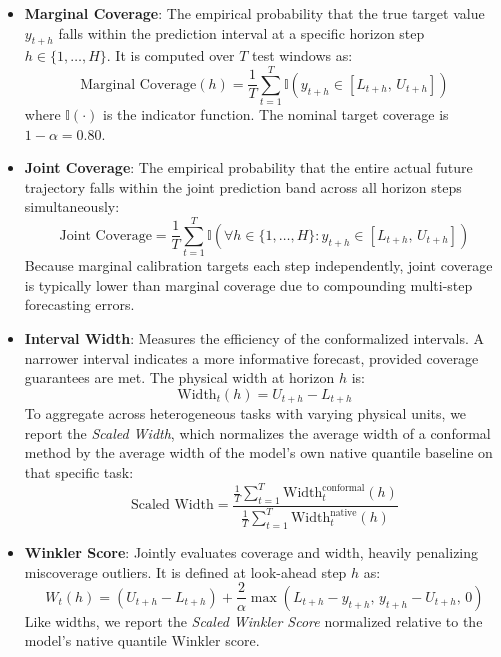 \documentclass[12pt, a4paper]{article}
\begin{document}
\begin{itemize}
	\item \textbf{Marginal Coverage}: The empirical probability that the true target value \(y_{t+h}\) falls within the prediction interval at a specific horizon step \(h \in \{1, \dots, H\}\). It is computed over \(T\) test windows as:
		\begin{equation}
			\text{Marginal Coverage}(h) = \frac{1}{T} \sum_{t=1}^T \mathbb{I}\left( y_{t+h} \in [L_{t+h}, \, U_{t+h}] \right)
		\end{equation}
		where \(\mathbb{I}(\cdot)\) is the indicator function. The nominal target coverage is \(1-\alpha = 0.80\).

	\item \textbf{Joint Coverage}: The empirical probability that the entire actual future trajectory falls within the joint prediction band across all horizon steps simultaneously:
		\begin{equation}
			\text{Joint Coverage} = \frac{1}{T} \sum_{t=1}^T \mathbb{I}\left( \forall h \in \{1, \dots, H\}: y_{t+h} \in [L_{t+h}, \, U_{t+h}] \right)
		\end{equation}
		Because marginal calibration targets each step independently, joint coverage is typically lower than marginal coverage due to compounding multi-step forecasting errors.

	\item \textbf{Interval Width}: Measures the efficiency of the conformalized intervals. A narrower interval indicates a more informative forecast, provided coverage guarantees are met. The physical width at horizon \(h\) is:
		\begin{equation}
			\text{Width}_t(h) = U_{t+h} - L_{t+h}
		\end{equation}
		To aggregate across heterogeneous tasks with varying physical units, we report the \textit{Scaled Width}, which normalizes the average width of a conformal method by the average width of the model's own native quantile baseline on that specific task:
		\begin{equation}
			\text{Scaled Width} = \frac{\frac{1}{T}\sum_{t=1}^T \text{Width}_t^{\text{conformal}}(h)}{\frac{1}{T}\sum_{t=1}^T \text{Width}_t^{\text{native}}(h)}
		\end{equation}

	\item \textbf{Winkler Score}: Jointly evaluates coverage and width, heavily penalizing miscoverage outliers. It is defined at look-ahead step \(h\) as:
		\begin{equation}
			W_t(h) = (U_{t+h} - L_{t+h}) + \frac{2}{\alpha} \max\left( L_{t+h} - y_{t+h}, \, y_{t+h} - U_{t+h}, \, 0 \right)
		\end{equation}
		Like widths, we report the \textit{Scaled Winkler Score} normalized relative to the model's native quantile Winkler score.


\end{itemize}
\end{document}
